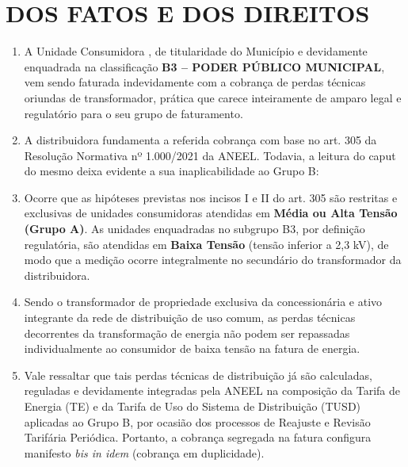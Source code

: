 \newcommand{\tipoRequerimento}{Perda por transformação}

\section{DOS FATOS E DOS DIREITOS}

\begin{enumerate}[resume]
\item A Unidade Consumidora \unidadeConsumidora{}, de titularidade do Município e devidamente enquadrada na classificação \textbf{B3 -- PODER PÚBLICO MUNICIPAL}, vem sendo faturada indevidamente com a cobrança de perdas técnicas oriundas de transformador, prática que carece inteiramente de amparo legal e regulatório para o seu grupo de faturamento.

\item A distribuidora fundamenta a referida cobrança com base no art. 305 da Resolução Normativa nº 1.000/2021 da ANEEL. Todavia, a leitura do caput do mesmo deixa evidente a sua inaplicabilidade ao Grupo B:

\item Ocorre que as hipóteses previstas nos incisos I e II do art. 305 são restritas e exclusivas de unidades consumidoras atendidas em \textbf{Média ou Alta Tensão (Grupo A)}. As unidades enquadradas no subgrupo B3, por definição regulatória, são atendidas em \textbf{Baixa Tensão} (tensão inferior a 2,3 kV), de modo que a medição ocorre integralmente no secundário do transformador da distribuidora.

\item Sendo o transformador de propriedade exclusiva da concessionária e ativo integrante da rede de distribuição de uso comum, as perdas técnicas decorrentes da transformação de energia não podem ser repassadas individualmente ao consumidor de baixa tensão na fatura de energia. 

\item Vale ressaltar que tais perdas técnicas de distribuição já são calculadas, reguladas e devidamente integradas pela ANEEL na composição da Tarifa de Energia (TE) e da Tarifa de Uso do Sistema de Distribuição (TUSD) aplicadas ao Grupo B, por ocasião dos processos de Reajuste e Revisão Tarifária Periódica. Portanto, a cobrança segregada na fatura configura manifesto \textit{bis in idem} (cobrança em duplicidade).


\end{enumerate}
